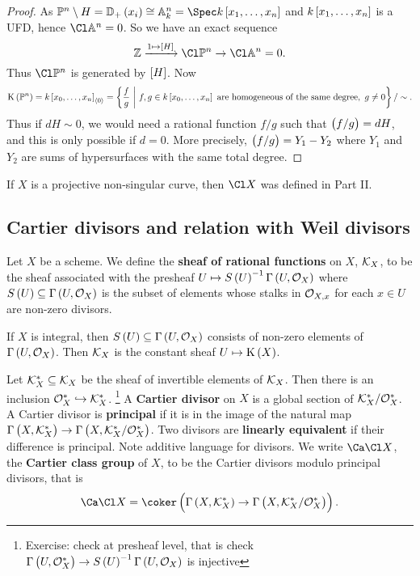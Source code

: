 \begin{proof}
As $ \PP^n \setminus H = \DD_+\br{x_i} \cong \AA_k^n = \Spec k\sbr{x_1, \dots, x_n} $ and $ k\sbr{x_1, \dots, x_n} $ is a UFD, hence $ \Cl \AA^n = 0 $. So we have an exact sequence
$$ \ZZ \xrightarrow{1 \mapsto \sbr{H}} \Cl \PP^n \to \Cl \AA^n = 0. $$
Thus $ \Cl \PP^n $ is generated by $ \sbr{H} $. Now
$$ \K\br{\PP^n} = k\sbr{x_0, \dots, x_n}_{\abr{0}} = \cbr{\dfrac{f}{g} \st f, g \in k\sbr{x_0, \dots, x_n} \ \text{are homogeneous of the same degree}, \ g \ne 0} / \sim. $$
Thus if $ dH \sim 0 $, we would need a rational function $ f / g $ such that $ \br{f / g} = dH $, and this is only possible if $ d = 0 $. More precisely, $ \br{f / g} = Y_1 - Y_2 $ where $ Y_1 $ and $ Y_2 $ are sums of hypersurfaces with the same total degree.
\end{proof}

\begin{remark*}
If $ X $ is a projective non-singular curve, then $ \Cl X $ was defined in Part II.
\end{remark*}

\subsection{Cartier divisors and relation with Weil divisors}

\begin{definition*}
Let $ X $ be a scheme. We define the \textbf{sheaf of rational functions} on $ X $, $ \mathcal{K}_X $, to be the sheaf associated with the presheaf $ U \mapsto S\br{U}^{-1}\Gamma\br{U, \OOO_X} $ where $ S\br{U} \subseteq \Gamma\br{U, \OOO_X} $ is the subset of elements whose stalks in $ \mathcal{O}_{X, x} $ for each $ x \in U $ are non-zero divisors.
\end{definition*}

\begin{example*}
If $ X $ is integral, then $ S\br{U} \subseteq \Gamma\br{U, \OOO_X} $ consists of non-zero elements of $ \Gamma\br{U, \OOO_X} $. Then $ \mathcal{K}_X $ is the constant sheaf $ U \mapsto \K\br{X} $.
\end{example*}

\pagebreak

\begin{definition*}
Let $ \mathcal{K}_X^* \subseteq \mathcal{K}_X $ be the sheaf of invertible elements of $ \mathcal{K}_X $. Then there is an inclusion $ \mathcal{O}_X^* \hookrightarrow \mathcal{K}_X^* $. \footnote{Exercise: check at presheaf level, that is check $ \Gamma\br{U, \OOO_X^*} \to S\br{U}^{-1}\Gamma\br{U, \OOO_X} $ is injective} A \textbf{Cartier divisor} on $ X $ is a global section of $ \mathcal{K}_X^* / \mathcal{O}_X^* $. A Cartier divisor is \textbf{principal} if it is in the image of the natural map $ \Gamma\br{X, \KKK_X^*} \to \Gamma\br{X, \KKK_X^* / \OOO_X^*} $. Two divisors are \textbf{linearly equivalent} if their difference is principal. Note additive language for divisors. We write $ \Ca\Cl X $, the \textbf{Cartier class group} of $ X $, to be the Cartier divisors modulo principal divisors, that is
$$ \Ca\Cl X = \coker \br{\Gamma\br{X, \KKK_X^*} \to \Gamma\br{X, \KKK_X^* / \OOO_X^*}}. $$
\end{definition*}

